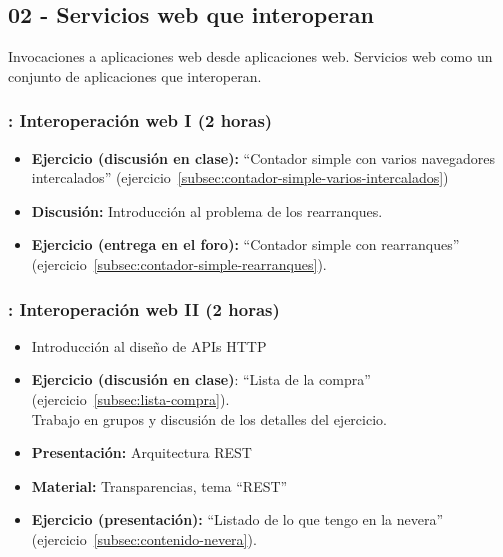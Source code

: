 \documentclass[a4paper,12pt]{article}
\begin{document}
\subsection{02 - Servicios web que interoperan}

Invocaciones a aplicaciones web desde aplicaciones web. Servicios web como un conjunto de aplicaciones que interoperan.

\subsubsection{\juevesG: Interoperación web I (2 horas)}
\label{cal:juevesG}

\begin{itemize}
\item \textbf{Ejercicio (discusión en clase):} ``Contador simple con varios 
navegadores intercalados'' (ejercicio~\ref{subsec:contador-simple-varios-intercalados})
\item \textbf{Discusión:} Introducción al problema de los rearranques.
\item \textbf{Ejercicio (entrega en el foro):} ``Contador simple con rearranques'' (ejercicio~\ref{subsec:contador-simple-rearranques}).
\end{itemize}

\subsubsection{\juevesH: Interoperación web II (2 horas)}
\label{cal:juevesH}

\begin{itemize}
\item Introducción al diseño de APIs HTTP
\item \textbf{Ejercicio (discusión en clase)}: ``Lista de la compra'' (ejercicio~\ref{subsec:lista-compra}). \\
  Trabajo en grupos y discusión de los detalles del ejercicio.
\item \textbf{Presentación:} Arquitectura REST
\item \textbf{Material:} Transparencias, tema ``REST''
\item \textbf{Ejercicio (presentación):} ``Listado de lo que tengo en la nevera'' (ejercicio~\ref{subsec:contenido-nevera}).
\end{itemize}
\end{document}
